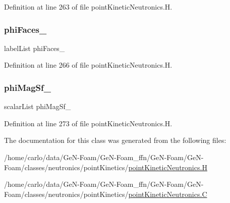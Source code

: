 Definition at line 263 of file point\+Kinetic\+Neutronics.\+H.

\mbox{\label{classFoam_1_1pointKineticNeutronics_ad3d8357db341cec8344bf456d650f9e2}} 
\subsubsection{\texorpdfstring{phi\+Faces\+\_\+}{phiFaces\_}}
{\footnotesize\ttfamily label\+List phi\+Faces\+\_\+\hspace{0.3cm}{\ttfamily [protected]}}



Definition at line 266 of file point\+Kinetic\+Neutronics.\+H.

\mbox{\label{classFoam_1_1pointKineticNeutronics_a09a770b75cb957ca39fea01393e00e5f}} 
\subsubsection{\texorpdfstring{phi\+Mag\+Sf\+\_\+}{phiMagSf\_}}
{\footnotesize\ttfamily scalar\+List phi\+Mag\+Sf\+\_\+\hspace{0.3cm}{\ttfamily [protected]}}



Definition at line 273 of file point\+Kinetic\+Neutronics.\+H.



The documentation for this class was generated from the following files\+:\begin{DoxyCompactItemize}
\item 
/home/carlo/data/\+Ge\+N-\/\+Foam/\+Ge\+N-\/\+Foam\+\_\+ffn/\+Ge\+N-\/\+Foam/\+Ge\+N-\/\+Foam/classes/neutronics/point\+Kinetics/\hyperlink{pointKineticNeutronics_8H}{point\+Kinetic\+Neutronics.\+H}\item 
/home/carlo/data/\+Ge\+N-\/\+Foam/\+Ge\+N-\/\+Foam\+\_\+ffn/\+Ge\+N-\/\+Foam/\+Ge\+N-\/\+Foam/classes/neutronics/point\+Kinetics/\hyperlink{pointKineticNeutronics_8C}{point\+Kinetic\+Neutronics.\+C}\end{DoxyCompactItemize}
